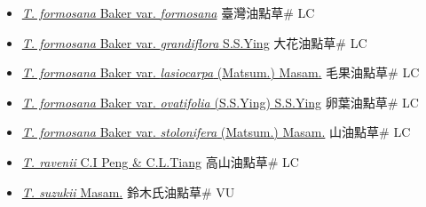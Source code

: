 \begin{itemize}
  \begin{itemize}
        \item[] \href{http://www.theplantlist.org/tpl1.1/search?q=Tricyrtis+formosana+var.+formosana}{\textit{T. formosana} Baker var. \textit{formosana}}   臺灣油點草\# LC
        \item[] \href{http://www.theplantlist.org/tpl1.1/search?q=Tricyrtis+formosana+var.+grandiflora}{\textit{T. formosana} Baker var. \textit{grandiflora} S.S.Ying}   大花油點草\# LC
        \item[] \href{http://www.theplantlist.org/tpl1.1/search?q=Tricyrtis+formosana+var.+lasiocarpa}{\textit{T. formosana} Baker var. \textit{lasiocarpa} (Matsum.) Masam.}   毛果油點草\# LC
        \item[] \href{http://www.theplantlist.org/tpl1.1/search?q=Tricyrtis+formosana+var.+ovatifolia}{\textit{T. formosana} Baker var. \textit{ovatifolia} (S.S.Ying) S.S.Ying}   卵葉油點草\# LC
        \item[] \href{http://www.theplantlist.org/tpl1.1/search?q=Tricyrtis+formosana+var.+stolonifera}{\textit{T. formosana} Baker var. \textit{stolonifera} (Matsum.) Masam.}   山油點草\# LC
        \item[] \href{http://www.theplantlist.org/tpl1.1/search?q=Tricyrtis+ravenii}{\textit{T. ravenii} C.I Peng \& C.L.Tiang}   高山油點草\# LC
        \item[] \href{http://www.theplantlist.org/tpl1.1/search?q=Tricyrtis+suzukii}{\textit{T. suzukii} Masam.}   鈴木氏油點草\# VU
  \end{itemize}
  \end{itemize}
